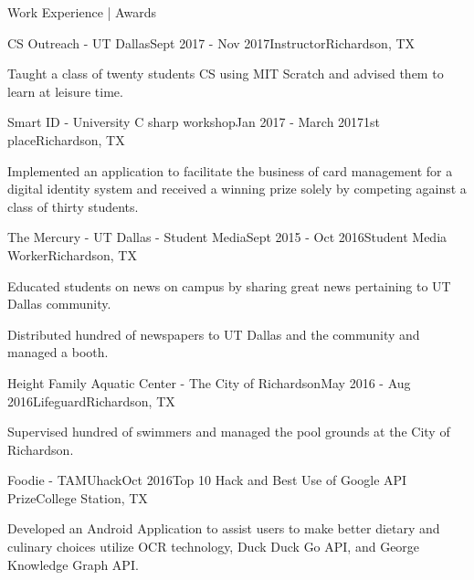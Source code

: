 \documentclass[9.5pt,a4paper, typewriter]{resume} %
\begin{document}
\begin{rSection}{Work Experience | Awards}
\begin{rSubsection}{CS Outreach - UT Dallas}{Sept 2017 - Nov 2017}{Instructor}{Richardson, TX}
\item Taught a class of twenty students CS using MIT Scratch and advised them to learn at leisure time.
\end{rSubsection}
\begin{rSubsection}{Smart ID - University C sharp workshop}{Jan 2017 - March 2017}{1st place}{Richardson, TX}
\item Implemented an application to facilitate the business of card management for a digital identity system and received a winning prize solely by competing against a class of thirty students.
\end{rSubsection}
\begin{rSubsection}{The Mercury - UT Dallas - Student Media}{Sept 2015 - Oct 2016}{Student Media Worker}{Richardson, TX}
\item Educated students on news on campus by sharing great news pertaining to UT Dallas community.
\item Distributed hundred of newspapers to UT Dallas and the community and managed a booth.
\end{rSubsection}
\begin{rSubsection}{Height Family Aquatic Center - The City of Richardson}{May 2016 - Aug 2016}{Lifeguard}{Richardson, TX}
\item Supervised hundred of swimmers and managed the pool grounds at the City of Richardson.
\end{rSubsection}
\begin{rSubsection}{Foodie - TAMUhack}{Oct 2016}{Top 10 Hack and Best Use of Google API Prize}{College Station, TX}
\item Developed an Android Application to assist users to make better dietary and culinary choices utilize OCR technology, Duck Duck Go API, and George Knowledge Graph API. 
\end{rSubsection}
\end{rSection}
\end{document}
